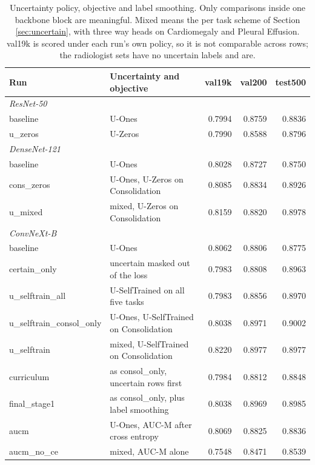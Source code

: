 
\begin{table}[H]
  \caption{Uncertainty policy, objective and label smoothing. Only comparisons inside
  one backbone block are meaningful. Mixed means the per task scheme of Section
  \ref{sec:uncertain}, with three way heads on Cardiomegaly and Pleural Effusion.
  val19k is scored under each run's own policy, so it is not comparable across rows;
  the radiologist sets have no uncertain labels and are.}
  \centering
  \footnotesize
  \begin{tabular}{llrrr}
    \toprule
    Run & Uncertainty and objective & val19k & val200 & test500 \\
    \midrule
    \multicolumn{5}{l}{\textit{ResNet-50}} \\
    baseline & U-Ones & 0.7994 & 0.8759 & 0.8836 \\
    u\_zeros & U-Zeros & 0.7990 & 0.8588 & 0.8796 \\
    \midrule
    \multicolumn{5}{l}{\textit{DenseNet-121}} \\
    baseline & U-Ones & 0.8028 & 0.8727 & 0.8750 \\
    cons\_zeros & U-Ones, U-Zeros on Consolidation & 0.8085 & 0.8834 & 0.8926 \\
    u\_mixed & mixed, U-Zeros on Consolidation & 0.8159 & 0.8820 & 0.8978 \\
    \midrule
    \multicolumn{5}{l}{\textit{ConvNeXt-B}} \\
    baseline & U-Ones & 0.8062 & 0.8806 & 0.8775 \\
    certain\_only & uncertain masked out of the loss & 0.7983 & 0.8808 & 0.8963 \\
    u\_selftrain\_all & U-SelfTrained on all five tasks & 0.7983 & 0.8856 & 0.8970 \\
    u\_selftrain\_consol\_only & U-Ones, U-SelfTrained on Consolidation & 0.8038 & 0.8971 & 0.9002 \\
    u\_selftrain & mixed, U-SelfTrained on Consolidation & 0.8220 & 0.8977 & 0.8977 \\
    curriculum & as consol\_only, uncertain rows first & 0.7984 & 0.8812 & 0.8848 \\
    final\_stage1 & as consol\_only, plus label smoothing & 0.8038 & 0.8969 & 0.8985 \\
    aucm & U-Ones, AUC-M after cross entropy & 0.8069 & 0.8825 & 0.8836 \\
    aucm\_no\_ce & mixed, AUC-M alone & 0.7548 & 0.8471 & 0.8539 \\
    \bottomrule
  \end{tabular}
  \label{tab:train}
\end{table}
